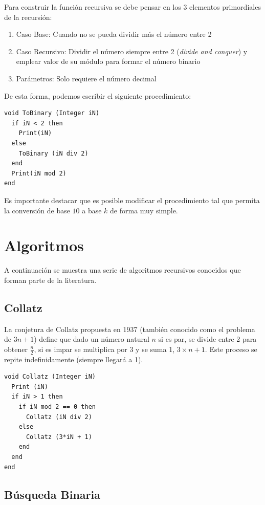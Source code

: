 Para construir la función recursiva se debe pensar en los 3 elementos primordiales de la recursión:
\begin{enumerate}
\item Caso Base: Cuando no se pueda dividir más el número entre 2
\item Caso Recursivo: Dividir el número siempre entre 2 (\textit{divide and conquer}) y emplear valor de su módulo para formar el número binario
\item Parámetros: Solo requiere el número decimal
\end{enumerate}

De esta forma, podemos escribir el siguiente procedimiento:

\begin{lstlisting}[upquote=true, language=pseudo]
void ToBinary (Integer iN)
  if iN < 2 then
    Print(iN)
  else
    ToBinary (iN div 2)
  end
  Print(iN mod 2)
end
\end{lstlisting}

Es importante destacar que es posible modificar el procedimiento tal que permita la conversión de base $10$ a base $k$ de forma muy simple.

\section{Algoritmos}

A continuación se muestra una serie de algoritmos recursivos conocidos que forman parte de la literatura.

\subsection{Collatz}
La conjetura de Collatz propuesta en 1937 (también conocido como el problema de $3n + 1$) define que dado un número natural $n$ si es par, se divide entre 2 para obtener $\frac{n}{2}$, si es impar se multiplica por 3 y se suma 1, $3 \times n + 1$. Este proceso se repite indefinidamente (siempre llegará a 1).
\begin{lstlisting}[upquote=true, language=pseudo]
void Collatz (Integer iN)
  Print (iN)
  if iN > 1 then
    if iN mod 2 == 0 then 
      Collatz (iN div 2) 
    else 
      Collatz (3*iN + 1)
    end
  end
end
\end{lstlisting}


\subsection{Búsqueda Binaria}

